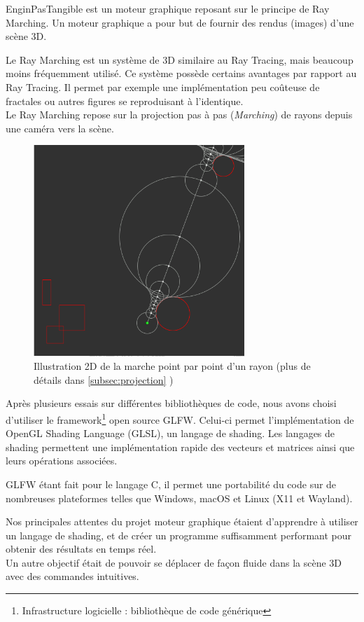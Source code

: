 
EnginPasTangible est un moteur graphique reposant sur le principe de Ray Marching. Un moteur graphique a pour but de fournir des rendus (images) d'une scène 3D.\par

Le Ray Marching est un système de 3D similaire au Ray Tracing, mais beaucoup moins fréquemment utilisé. Ce système possède certains avantages par rapport au Ray Tracing. 
Il permet par exemple une implémentation peu coûteuse de fractales ou autres figures se reproduisant à l'identique. \\
Le Ray Marching repose sur la projection pas à pas (\emph{Marching}) de rayons depuis une caméra vers la scène.


\begin{figure}[h]
    \centering
    \includegraphics[width=8cm]{images/marching.png}
    \caption{Illustration 2D de la marche point par point d'un rayon (plus de détails dans \ref{subsec:projection} )}
    \label{fig:my_label}
\end{figure}

Après plusieurs essais sur différentes bibliothèques de code, nous avons choisi d'utiliser le framework\footnote[1]{Infrastructure logicielle : bibliothèque de code générique} open source GLFW. Celui-ci permet l'implémentation de OpenGL Shading Language (GLSL), un langage de shading. Les langages de shading permettent une implémentation rapide des vecteurs et matrices ainsi que leurs opérations associées.\par
GLFW étant fait pour le langage C, il permet une portabilité du code sur de nombreuses plateformes telles que Windows, macOS et Linux (X11 et Wayland).\\ \par

Nos principales attentes du projet moteur graphique étaient d'apprendre à utiliser un langage de shading, et de créer un programme suffisamment performant pour obtenir des résultats en temps réel. \\
Un autre objectif était de pouvoir se déplacer de façon fluide dans la scène 3D avec des commandes intuitives.